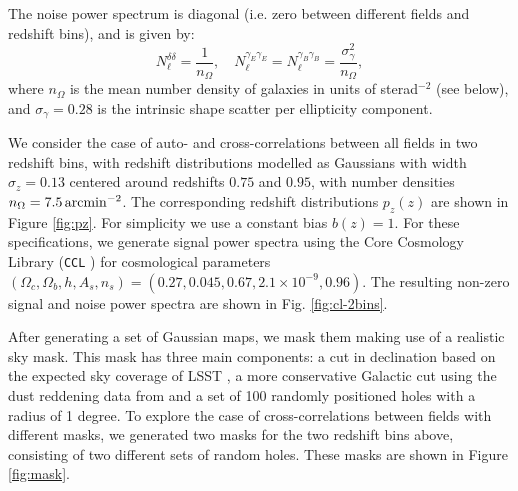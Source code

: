 \documentclass[a4paper,11pt]{article}
\begin{document}
      The noise power spectrum is diagonal (i.e. zero between different fields and redshift bins), and is given by:
      \begin{equation}
        N_\ell^{\delta\delta} = \frac{1}{n_\Omega},\hspace{12pt}
        N_\ell^{\gamma_E\gamma_E} = N_\ell^{\gamma_B\gamma_B} = \frac{\sigma_\gamma^2}{n_\Omega},
      \end{equation}
      where $n_\Omega$ is the mean number density of galaxies in units of sterad$^{-2}$ (see below), and $\sigma_\gamma=0.28$ is the intrinsic shape scatter per ellipticity component.

      We consider the case of auto- and cross-correlations between all fields in two redshift bins, with redshift distributions modelled as Gaussians with width $\sigma_z=0.13$ centered around redshifts $0.75$ and $0.95$, with number densities $n_\Omega=7.5\,{\rm arcmin}^{-2}$. The corresponding redshift distributions $p_z(z)$ are shown in Figure \ref{fig:pz}. For simplicity we use a constant bias $b(z)=1$. For these specifications, we generate signal power spectra using the Core Cosmology Library ({\tt CCL} \cite{2019ApJS..242....2C}) for cosmological parameters $(\Omega_c,\Omega_b,h,A_s,n_s)=(0.27,0.045,0.67,2.1\times10^{-9},0.96)$. The resulting non-zero signal and noise power spectra are shown in Fig. \ref{fig:cl-2bins}.

      After generating a set of Gaussian maps, we mask them making use of a realistic sky mask. This mask has three main components: a cut in declination based on the expected sky coverage of LSST \cite{2014SPIE.9150E..15D}, a more conservative Galactic cut using the dust reddening data from \cite{1998ApJ...500..525S} and a set of 100 randomly positioned holes with a radius of 1 degree. To explore the case of cross-correlations between fields with different masks, we generated two masks for the two redshift bins above, consisting of two different sets of random holes. These masks are shown in Figure \ref{fig:mask}.
\end{document}
